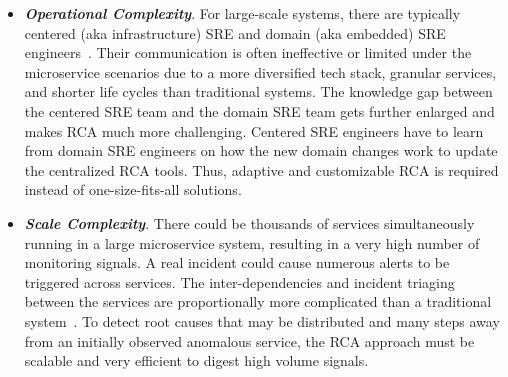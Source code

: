 \begin{itemize}
    \item \textbf{\emph{Operational Complexity}}. For large-scale systems, there are typically centered (aka infrastructure) SRE and domain (aka embedded) SRE engineers~\cite{GoogleSRE}. Their communication is often ineffective or limited under the microservice scenarios due to a more diversified tech stack, granular services, and shorter life cycles than traditional systems. The knowledge gap between the centered SRE team and the domain SRE team gets further enlarged and makes RCA much more challenging. Centered SRE engineers have to learn from domain SRE engineers on how the new domain changes work to update the centralized RCA tools. Thus, adaptive and customizable RCA is required instead of one-size-fits-all solutions. %
        
    \item \textbf{\emph{Scale Complexity}}. There could be thousands of services simultaneously running in a large microservice system, resulting in a very high number of monitoring signals. A real incident could cause numerous alerts to be triggered across services. The inter-dependencies and incident triaging between the services are proportionally more complicated than a traditional system~\cite{wu2020microrca}. To detect root causes that may be distributed and many steps away from an initially observed anomalous service, the RCA approach must be scalable and very efficient to digest high volume signals. %
    

\end{itemize}

